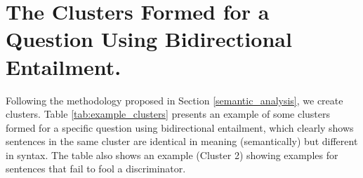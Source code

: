 \section{The Clusters Formed for a Question Using Bidirectional Entailment.}
Following the methodology proposed in Section \ref{semantic_analysis}, we create clusters. Table \ref{tab:example_clusters} presents an example of some clusters formed for a specific question using bidirectional entailment, which clearly shows sentences in the same cluster are identical in meaning (semantically) but different in syntax. The table also shows an example (Cluster 2) showing examples for sentences that fail to fool a discriminator. 




